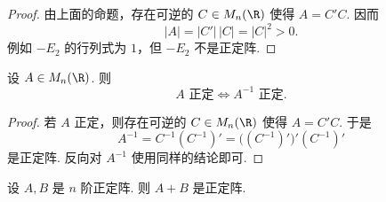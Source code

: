 \begin{proof}
	由上面的命题，存在可逆的 $C\in M_n(\R)$ 使得 $A=C'C$. 因而
	\[
	|A|=|C'|\,|C|=|C|^2>0.
	\]
	例如 $-E_2$ 的行列式为 $1$，但 $-E_2$ 不是正定阵.
\end{proof}

\begin{proposition}
	设 $A\in M_n(\R)$. 则
	\[
	A\text{ 正定}\Longleftrightarrow A^{-1}\text{ 正定}.
	\]
\end{proposition}

\begin{proof}
	若 $A$ 正定，则存在可逆的 $C\in M_n(\R)$ 使得 $A=C'C$. 于是
	\[
	A^{-1}=C^{-1}(C^{-1})'
	=\bigl((C^{-1})'\bigr)'(C^{-1})'
	\]
	是正定阵. 反向对 $A^{-1}$ 使用同样的结论即可.
\end{proof}

\begin{lemma}
	设 $A,B$ 是 $n$ 阶正定阵. 则 $A+B$ 是正定阵.
\end{lemma}
